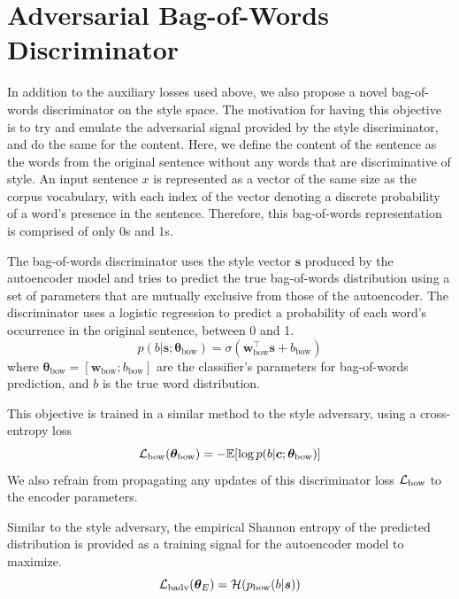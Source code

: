 \section{Adversarial Bag-of-Words Discriminator} \label{sec:adversarial-bow-objective}

In addition to the auxiliary losses used above, we also propose a novel bag-of-words discriminator on the style space. The motivation for having this objective is to try and emulate the adversarial signal provided by the style discriminator, and do the same for the content. Here, we define the content of the sentence as the words from the original sentence without any words that are discriminative of style. An input sentence $x$ is represented as a vector of the same size as the corpus vocabulary, with each index of the vector denoting a discrete probability of a word's presence in the sentence. Therefore, this bag-of-words representation is comprised of only 0s and 1s.

The bag-of-words discriminator uses the style vector $\bm s$ produced by the autoencoder model and tries to predict the true bag-of-words distribution using a set of parameters that are mutually exclusive from those of the autoencoder. The discriminator uses a logistic regression to predict a probability of each word's occurrence in the original sentence, between 0 and 1.
\begin{equation}
	p(b | \bm s; \bm\theta_\text{bow}) = \sigma(\bm w_\text{bow}^\top \bm s + b_\text{bow})
\end{equation}
where $\bm\theta_\text{bow}=[\bm w_\text{bow}; b_\text{bow}]$ are the classifier's parameters for bag-of-words prediction, and $b$ is the true word distribution.

This objective is trained in a similar method to the style adversary, using a cross-entropy loss
\begin{equation} \label{eqn:adv-bow-disc-loss}
	\mathcal{L}_\text{bow}(\bm\theta_\text{bow}) =
	- \mathbb{E} [\log p(b | \bm c; \bm\theta_\text{bow})]
\end{equation}
We also refrain from propagating any updates of this discriminator loss $\mathcal{L}_\text{bow}$ to the encoder parameters.

Similar to the style adversary, the empirical Shannon entropy of the predicted distribution is provided as a training signal for the autoencoder model to maximize.
\begin{equation}
	\mathcal{L}_\text{badv}(\bm\theta_E) = \mathcal{H}(p_\text{bow}(b | \bm s))
\end{equation}


